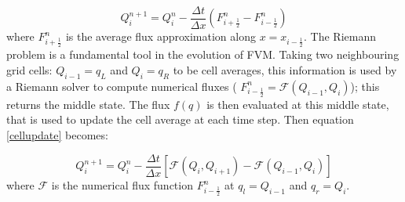\documentclass[10pt,a4paper]{article}
\begin{document}
	\begin{equation}
		Q_{i}^{n+1} = Q_{i}^{n} - \frac{\Delta t}{\Delta x} (F_{i+\frac{1}{2}}^{n} - F_{i-\frac{1}{2}}^{n})
		\label{cellupdate}
	\end{equation}	
	where $F_{i+\frac{1}{2}}^{n} $ is the average flux approximation along $x=x_{i-\frac{1}{2}}$.
	The Riemann problem is a fundamental tool in the evolution of FVM. Taking two neighbouring grid cells: $Q_{i-1} = q_{L}$ and $Q_{i} = q_{R}$ to be cell averages, this information is used by a Riemann solver to compute numerical fluxes ( $F_{i-\frac{1}{2}}^{n} = \mathcal{F}(Q_{i-1} , Q_{i} )$); this returns the middle state.  The flux $f(q)$ is then evaluated at this middle state, that is used to update the cell average at each time step. Then equation \eqref{cellupdate} becomes:
	
	\begin{equation}
		Q_{i}^{n+1} = Q_{i}^{n} - \frac{\Delta t}{\Delta x} \left[ \mathcal{F}(Q_{i} , Q_{i+1} ) - \mathcal{F}(Q_{i-1} , Q_{i} ) \right]
		\label{cellupdat}
	\end{equation}
	where $\mathcal{F}$ is the  numerical flux function $F_{i-\frac{1}{2}}^{n}$ at $q_l = Q_{i-1}$  and $q_r = Q_{i}$.
	
\end{document}

